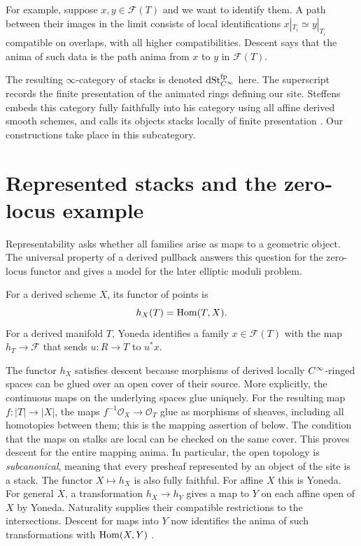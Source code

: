For example, suppose $x,y\in\mathcal F(T)$ and we want to identify
them. A path between their images in the limit consists of local
identifications $x|_{T_i}\simeq y|_{T_i}$ compatible on overlaps,
with all higher compatibilities. Descent says that the anima of such
data is the path anima from $x$ to $y$ in $\mathcal F(T)$.

The resulting $\infty$-category of stacks is denoted
$\mathrm{dSt}_{C^\infty}^{\mathrm{fp}}$ here.
The superscript records the finite presentation of the animated rings defining our site.
Steffens embeds this category fully faithfully into his category using
all affine derived smooth schemes, and calls its objects stacks locally
of finite presentation
\cite[Proposition~2.1.40 and Definition~2.1.41]
{Steffens_Representability_Elliptic_Moduli}.
Our constructions take place in this subcategory.

\section{Represented stacks and the zero-locus example}

Representability asks whether all families arise as maps to a geometric
object. The universal property of a derived pullback answers this
question for the zero-locus functor and gives a model for the later
elliptic moduli problem.

For a derived scheme $X$, its functor of points is
\[
 h_X(T)=\operatorname{Hom}(T,X).
\]
For a derived manifold $T$, Yoneda identifies a family $x\in\mathcal F(T)$
with the map $h_T\to\mathcal F$ that sends $u\colon R\to T$ to $u^*x$.

The functor $h_X$ satisfies descent because morphisms of derived locally $C^\infty$-ringed spaces can
be glued over an open cover of their source.
More explicitly, the continuous maps on the underlying spaces glue
uniquely. For the resulting map $f\colon|T|\to|X|$, the maps
$f^{-1}\mathcal O_X\to\mathcal O_T$ glue as morphisms of sheaves,
including all homotopies between them; this is the mapping assertion of
 below. The condition that
the maps on stalks are local can be checked on the same cover.
This proves descent for the entire mapping anima. In particular, the open
topology is \emph{subcanonical}, meaning that every presheaf represented
by an object of the site is a stack.
The functor $X\mapsto h_X$ is also fully faithful. For affine $X$
this is Yoneda. For general $X$, a transformation $h_X\to h_Y$
gives a map to $Y$ on each affine open of $X$ by Yoneda. Naturality
supplies their compatible restrictions to the intersections. Descent
for maps into $Y$ now identifies the anima of such transformations
with $\operatorname{Hom}(X,Y)$
\cite[Proposition~2.1.35(4)]{Steffens_Representability_Elliptic_Moduli}.

